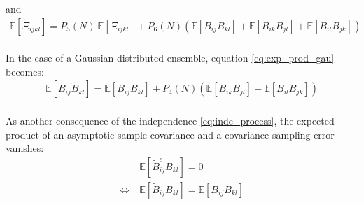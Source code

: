 \documentclass[12pt]{scrartcl}
\begin{document}
and
\begin{align}
\label{eq:exp_mom_4_exp}
\mathbb{E} \left[\widetilde{\Xi}_{ijkl}\right] = P_5(N) \ \mathbb{E} \left[\Xi_{ijkl}\right]+ P_6(N) \left(\mathbb{E} \left[B_{ij}B_{kl}\right] + \mathbb{E} \left[B_{ik}B_{jl}\right] + \mathbb{E} \left[B_{il}B_{jk}\right] \right)
\end{align}
$  $\\
In the case of a Gaussian distributed ensemble, equation \eqref{eq:exp_prod_gau} becomes:
\begin{align}
\label{eq:exp_prod_gau_exp}
\mathbb{E} \left[\widetilde{B}_{ij} \widetilde{B}_{kl}\right] = \mathbb{E} \left[B_{ij} B_{kl}\right] + P_4(N) \left(\mathbb{E} \left[B_{ik} B_{jl}\right] + \mathbb{E} \left[B_{il} B_{jk}\right]\right)
\end{align}
$  $\\
As another consequence of the independence \eqref{eq:inde_process}, the expected product of an asymptotic sample covariance and a covariance sampling error vanishes:
\begin{align}
& \mathbb{E}\left[\widetilde{B}^e_{ij} B_{kl} \right] = 0 \\
\label{eq:truth_noise_inde}
\Leftrightarrow \ & \mathbb{E}\left[\widetilde{B}_{ij} B_{kl} \right] = \mathbb{E}\left[B_{ij} B_{kl} \right]
\end{align}
\end{document}
